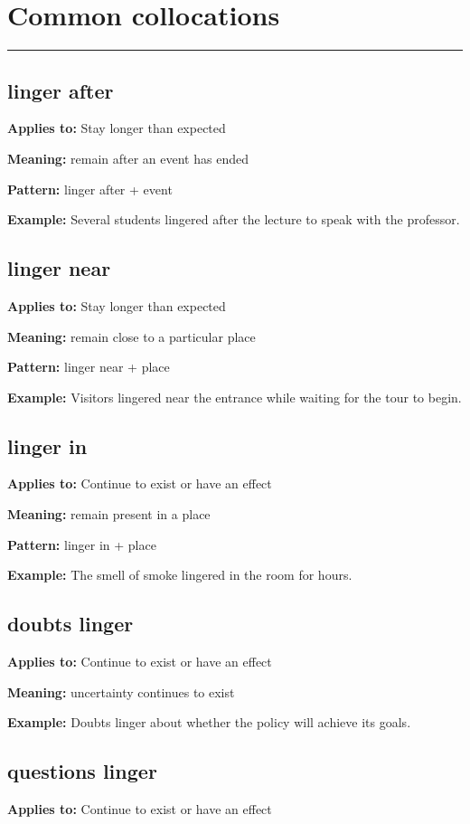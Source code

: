 \documentclass[11pt]{article}
\newcommand{\sectionrule}{\par\vspace{-0.5em}\noindent\textcolor{Accent}{\rule{\linewidth}{0.6pt}}\par}
\begin{document}
\section{Common collocations}
\sectionrule
\subsection{linger after}
\textbf{Applies to:} Stay longer than expected

\textbf{Meaning:} remain after an event has ended

\textbf{Pattern:} linger after + event

\textbf{Example:} Several students lingered after the lecture to speak with the professor.

\subsection{linger near}
\textbf{Applies to:} Stay longer than expected

\textbf{Meaning:} remain close to a particular place

\textbf{Pattern:} linger near + place

\textbf{Example:} Visitors lingered near the entrance while waiting for the tour to begin.

\subsection{linger in}
\textbf{Applies to:} Continue to exist or have an effect

\textbf{Meaning:} remain present in a place

\textbf{Pattern:} linger in + place

\textbf{Example:} The smell of smoke lingered in the room for hours.

\subsection{doubts linger}
\textbf{Applies to:} Continue to exist or have an effect

\textbf{Meaning:} uncertainty continues to exist

\textbf{Example:} Doubts linger about whether the policy will achieve its goals.

\subsection{questions linger}
\textbf{Applies to:} Continue to exist or have an effect
\end{document}
